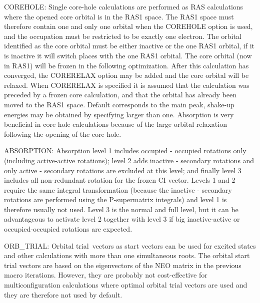 
COREHOLE: Single core-hole calculations are
performed as RAS calculations where the opened core orbital is in
the RAS1 space.  The RAS1 space must therefore contain one and
only one orbital when the COREHOLE option is used, and the
occupation must be restricted to be exactly one electron. The
orbital identified as the core orbital must be either inactive or
the one RAS1 orbital, if it is inactive it will switch places with
the one RAS1 orbital. The core orbital (now in RAS1) will be
frozen in the following optimization. After this calculation has
converged, the CORERELAX option may be added and the core orbital
will be relaxed.  When CORERELAX is
specified it is assumed that the calculation was preceded by a
frozen core calculation, and that the
orbital has already been moved to the RAS1 space. Default
corresponds to the main peak, shake-up energies may be obtained by
specifying  larger than one. Absorption is
very beneficial in core hole calculations because of the large
orbital relaxation following the opening of the core hole.

ABSORPTION: Absorption level 1 includes occupied - occupied rotations
only (including active-active rotations); level 2 adds inactive -
secondary rotations and only active - secondary rotations are excluded
at this level; and finally level 3 includes all non-redundant rotation
for the frozen CI vector.  Levels 1 and 2 require the same integral
transformation (because the inactive - secondary rotations are
performed using the P-supermatrix integrals) and level 1 is therefore
usually not used. Level 3 is the normal and full level, but it can be
advantageous to activate level 2 together with level 3 if big
inactive-active or occupied-occupied rotations are expected.

ORB\_TRIAL: Orbital trial\ vectors as
start vectors can be used for
excited states and other calculations with more than one simultaneous
roots.  The orbital start trial vectors are based on the eigenvectors of
the NEO matrix in the previous macro iterations.  However, they are
probably not cost-effective for multiconfiguration calculations where
optimal orbital trial vectors are
used and they are therefore not used
by default.

